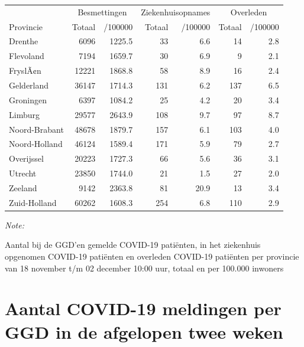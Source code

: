 \documentclass[
  english,
  man,floatsintext]{apa6}
\begin{document}
\begin{table}
\centering
\begin{threeparttable}
\begin{tabular}{lrrrrrr}
\toprule
\multicolumn{1}{c}{ } & \multicolumn{2}{c}{Besmettingen} & \multicolumn{2}{c}{Ziekenhuisopnames} & \multicolumn{2}{c}{Overleden} \\
\cmidrule(l{3pt}r{3pt}){2-3} \cmidrule(l{3pt}r{3pt}){4-5} \cmidrule(l{3pt}r{3pt}){6-7}
Provincie & Totaal & /100000 & Totaal & /100000 & Totaal & /100000\\
\midrule
Drenthe & 6096 & 1225.5 & 33 & 6.6 & 14 & 2.8\\
Flevoland & 7194 & 1659.7 & 30 & 6.9 & 9 & 2.1\\
FryslÃ¢n & 12221 & 1868.8 & 58 & 8.9 & 16 & 2.4\\
Gelderland & 36147 & 1714.3 & 131 & 6.2 & 137 & 6.5\\
Groningen & 6397 & 1084.2 & 25 & 4.2 & 20 & 3.4\\
Limburg & 29577 & 2643.9 & 108 & 9.7 & 97 & 8.7\\
Noord-Brabant & 48678 & 1879.7 & 157 & 6.1 & 103 & 4.0\\
Noord-Holland & 46124 & 1589.4 & 171 & 5.9 & 79 & 2.7\\
Overijssel & 20223 & 1727.3 & 66 & 5.6 & 36 & 3.1\\
Utrecht & 23850 & 1744.0 & 21 & 1.5 & 27 & 2.0\\
Zeeland & 9142 & 2363.8 & 81 & 20.9 & 13 & 3.4\\
Zuid-Holland & 60262 & 1608.3 & 254 & 6.8 & 110 & 2.9\\
\bottomrule
\end{tabular}
\begin{tablenotes}
\item \textit{Note: } 
\item Aantal bij de GGD’en gemelde COVID-19 patiënten, in het ziekenhuis opgenomen COVID-19 patiënten en overleden COVID-19 patiënten per provincie van 18 november t/m 02 december 10:00 uur, totaal en per 100.000 inwoners
\end{tablenotes}
\end{threeparttable}
\end{table}

\newpage

\hypertarget{aantal-covid-19-meldingen-per-ggd-in-de-afgelopen-twee-weken}{%
\section{Aantal COVID-19 meldingen per GGD in de afgelopen twee weken}\label{aantal-covid-19-meldingen-per-ggd-in-de-afgelopen-twee-weken}}
\end{document}
